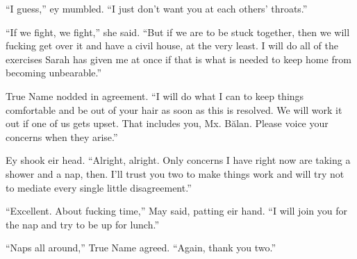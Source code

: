 ``I guess,'' ey mumbled. ``I just don't want you at each others' throats.''

``If we fight, we fight,'' she said. ``But if we are to be stuck together, then we will fucking get over it and have a civil house, at the very least. I will do all of the exercises Sarah has given me at once if that is what is needed to keep home from becoming unbearable.''

True Name nodded in agreement. ``I will do what I can to keep things comfortable and be out of your hair as soon as this is resolved. We will work it out if one of us gets upset. That includes you, Mx. Bălan. Please voice your concerns when they arise.''

Ey shook eir head. ``Alright, alright. Only concerns I have right now are taking a shower and a nap, then. I'll trust you two to make things work and will try not to mediate every single little disagreement.''

``Excellent. About fucking time,'' May said, patting eir hand. ``I will join you for the nap and try to be up for lunch.''

``Naps all around,'' True Name agreed. ``Again, thank you two.''
